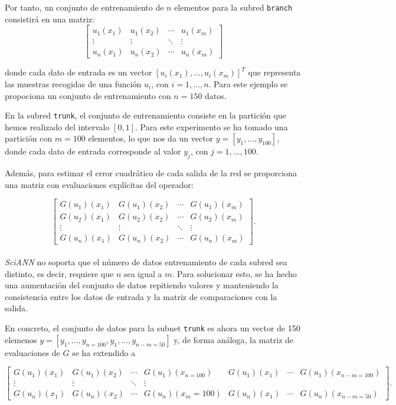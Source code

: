 Por tanto, un conjunto de entrenamiento de $n$ elementos para la subred \texttt{branch} consistirá en una matriz: 
\[
\begin{bmatrix}
u_1(x_1) & u_1(x_2) & \cdots & u_1(x_m) \\
\vdots & \vdots & \ddots & \vdots \\
u_n(x_1) & u_n(x_2) & \cdots & u_n(x_m)
\end{bmatrix}
\]

donde cada dato de entrada es un vector $[u_i(x_{1}),\dots,u_i(x_{m})]^{T}$ que representa las muestras recogidas de una función $u_{i}$, con $i=1,\dots,n$. Para este ejemplo se propociona un conjunto de entrenamiento con $n=150$ datos.

En la subred \texttt{trunk}, el conjunto de entrenamiento consiste en la partición que hemos realizado del intervalo $[0,1]$. Para este experimento se ha tomado una partición con $m=100$ elementos, lo que nos da un vector $y = [y_{1},\dots, y_{100}]$, donde cada dato de entrada corresponde al valor $y_{j}$, con $j=1,\dots,100$. 


Además, para estimar el error cuadrático de cada salida de la red se proporciona una matriz con evaluaciones explícitas del operador:

\[
\begin{bmatrix}
G(u_1)(x_1) & G(u_1)(x_2) & \cdots & G(u_1)(x_m) \\
G(u_2)(x_1) & G(u_2)(x_2) & \cdots & G(u_2)(x_m) \\
\vdots & \vdots & \ddots & \vdots \\
G(u_n)(x_1) & G(u_n)(x_2) & \cdots & G(u_n)(x_m)
\end{bmatrix}.
\] \\

\textit{SciANN} no soporta que el número de datos entrenamiento de cada subred sea distinto, es decir, requiere que $n$ sea igual a $m$. Para solucionar esto, se ha hecho una aumentación del conjunto de datos repitiendo valores y manteniendo la consistencia entre los datos de entrada y la matriz de comparaciones con la salida.

En concreto, el conjunto de datos para la subnet \texttt{trunk} es ahora un vector de 150 elemenos $y=[y_{1},\dots, y_{n=100},y_{1},\dots,y_{n-m=50}]$ y, de forma análoga, la matriz de evaluaciones de $G$ se ha extendido a

\[
\begin{bmatrix}
G(u_1)(x_1) & G(u_1)(x_2) & \cdots & G(u_1)(x_{n=100})  & G(u_1)(x_1) & \cdots & G(u_1)(x_{n-m=100}) \\
\vdots & \vdots & \ddots & \vdots \\
G(u_n)(x_1) & G(u_n)(x_2) & \cdots & G(u_n)(x_m=100) & G(u_n)(x_1) & \cdots & G(u_n)(x_{n-m=50})
\end{bmatrix}
.\] \\

